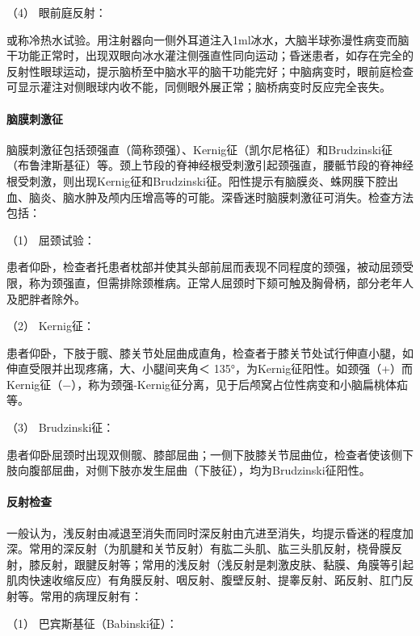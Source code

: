 \hypertarget{text00010.htmlux5cux23CHP1-2-2-1-3-4-4}{}
（4） 眼前庭反射：

或称冷热水试验。用注射器向一侧外耳道注入1ml冰水，大脑半球弥漫性病变而脑干功能正常时，出现双眼向冰水灌注侧强直性同向运动；昏迷患者，如存在完全的反射性眼球运动，提示脑桥至中脑水平的脑干功能完好；中脑病变时，眼前庭检查可显示灌注对侧眼球内收不能，同侧眼外展正常；脑桥病变时反应完全丧失。

\paragraph{脑膜刺激征}

脑膜刺激征包括颈强直（简称颈强）、Kernig征（凯尔尼格征）和Brudzinski征（布鲁津斯基征）等。颈上节段的脊神经根受刺激引起颈强直，腰骶节段的脊神经根受刺激，则出现Kernig征和Brudzinski征。阳性提示有脑膜炎、蛛网膜下腔出血、脑炎、脑水肿及颅内压增高等的可能。深昏迷时脑膜刺激征可消失。检查方法包括：

\hypertarget{text00010.htmlux5cux23CHP1-2-2-1-3-5-1}{}
（1） 屈颈试验：

患者仰卧，检查者托患者枕部并使其头部前屈而表现不同程度的颈强，被动屈颈受限，称为颈强直，但需排除颈椎病。正常人屈颈时下颏可触及胸骨柄，部分老年人及肥胖者除外。

\hypertarget{text00010.htmlux5cux23CHP1-2-2-1-3-5-2}{}
（2） Kernig征：

患者仰卧，下肢于髋、膝关节处屈曲成直角，检查者于膝关节处试行伸直小腿，如伸直受限并出现疼痛，大、小腿间夹角＜
135°，为Kernig征阳性。如颈强（+）而Kernig征（−），称为颈强-Kernig征分离，见于后颅窝占位性病变和小脑扁桃体疝等。

\hypertarget{text00010.htmlux5cux23CHP1-2-2-1-3-5-3}{}
（3） Brudzinski征：

患者仰卧屈颈时出现双侧髋、膝部屈曲；一侧下肢膝关节屈曲位，检查者使该侧下肢向腹部屈曲，对侧下肢亦发生屈曲（下肢征），均为Brudzinski征阳性。

\paragraph{反射检查}

一般认为，浅反射由减退至消失而同时深反射由亢进至消失，均提示昏迷的程度加深。常用的深反射（为肌腱和关节反射）有肱二头肌、肱三头肌反射，桡骨膜反射，膝反射，跟腱反射等；常用的浅反射（浅反射是刺激皮肤、黏膜、角膜等引起肌肉快速收缩反应）有角膜反射、咽反射、腹壁反射、提睾反射、跖反射、肛门反射等。常用的病理反射有：

\hypertarget{text00010.htmlux5cux23CHP1-2-2-1-3-6-1}{}
（1） 巴宾斯基征（Babinski征）：

